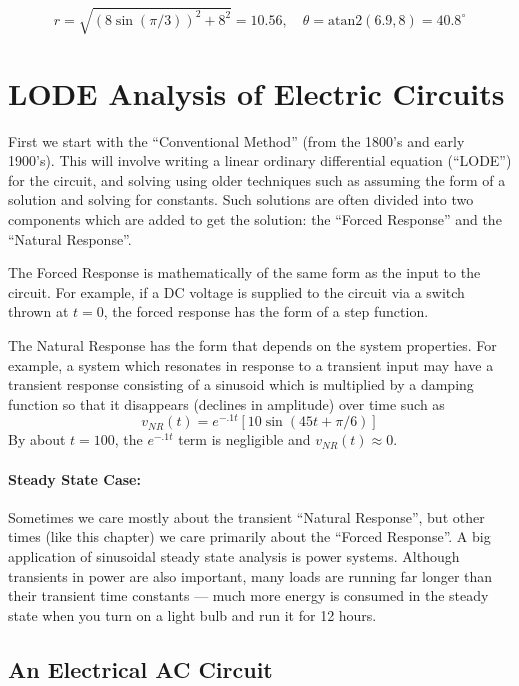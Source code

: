 \[
r = \sqrt{(8\sin(\pi/3))^2+8^2} = 10.56,\quad \theta = \mathrm{atan2}(6.9, 8) = 40.8^\circ
\]



\section{LODE Analysis of Electric Circuits  }


First we start with the
``Conventional Method'' (from the 1800's and early 1900's).   This will involve writing
a linear ordinary differential equation (``LODE'') for the circuit, and solving using
older techniques such as assuming the form of a solution and solving for constants.
Such solutions are often divided into two components which are added to get the solution:  the ``Forced Response''
and the ``Natural Response''.

The Forced Response is mathematically of the same form as the input to the circuit. For example,
if a DC voltage is supplied to the circuit via a switch thrown at $t=0$, the forced response
has the form of a   step function.

The Natural Response has the form that depends on the system properties.  For example,
a system which resonates in response to a transient input may have a transient response consisting
of a sinusoid which is multiplied by a damping function so that it disappears (declines in amplitude)
over time such as
\[
v_{NR}(t) =e^{-.1t} [ 10 \sin(45t+\pi/6) ]
\]
By about $t=100$, the $e^{-.1t}$ term is negligible and $v_{NR}(t)\approx 0$.


\paragraph{Steady State Case:}
Sometimes we care mostly about the transient ``Natural Response'', but other times (like this chapter) we care primarily
about the  ``Forced Response''.   A big application of sinusoidal steady state analysis is power
systems.  Although transients in power are also important, many loads are running far longer than
their transient time constants --- much more energy is consumed in the steady state when you turn
on a light bulb and run it for 12 hours.



\subsection{An Electrical AC Circuit}

